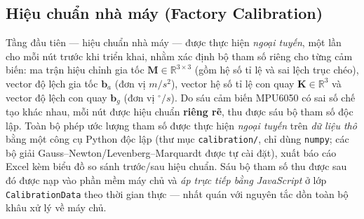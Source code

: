 \documentclass[../DoAn.tex]{subfiles}
\begin{document}
\subsection{Hiệu chuẩn nhà máy (Factory Calibration)}
\label{subsec:impl_factory}
Tầng đầu tiên --- hiệu chuẩn nhà máy --- được thực hiện \emph{ngoại tuyến}, một lần cho mỗi nút trước khi triển khai, nhằm xác định bộ tham số riêng cho từng cảm biến: ma trận hiệu chỉnh gia tốc $\mathbf{M}\in\mathbb{R}^{3\times3}$ (gồm hệ số tỉ lệ và sai lệch trục chéo), vector độ lệch gia tốc $\mathbf{b}_a$ (đơn vị $\si{m/s^2}$), vector hệ số tỉ lệ con quay $\mathbf{K}\in\mathbb{R}^{3}$ và vector độ lệch con quay $\mathbf{b}_g$ (đơn vị $^{\circ}/\si{s}$). Do sáu cảm biến MPU6050 có sai số chế tạo khác nhau, mỗi nút được hiệu chuẩn \textbf{riêng rẽ}, thu được sáu bộ tham số độc lập. Toàn bộ phép ước lượng tham số được thực hiện \emph{ngoại tuyến} trên \emph{dữ liệu thô} bằng một công cụ Python độc lập (thư mục \texttt{calibration/}, chỉ dùng \texttt{numpy}; các bộ giải Gauss--Newton/Levenberg--Marquardt được tự cài đặt), xuất báo cáo Excel kèm biểu đồ so sánh trước/sau hiệu chuẩn. Sáu bộ tham số thu được sau đó được nạp vào phần mềm máy chủ và \emph{áp trực tiếp bằng JavaScript} ở lớp \texttt{CalibrationData} theo thời gian thực --- nhất quán với nguyên tắc dồn toàn bộ khâu xử lý về máy chủ.
\end{document}
